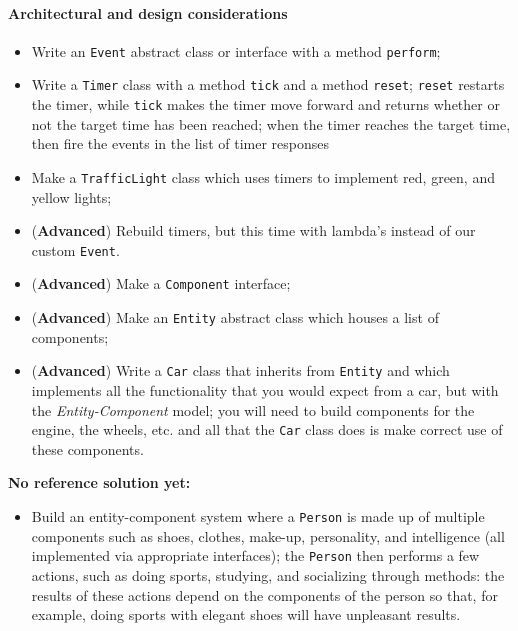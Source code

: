 \documentclass[12pt,a4paper,final]{article}
\begin{document}
		\paragraph{Architectural and design considerations}
		\begin{itemize}
			\item Write an \texttt{Event} abstract class or interface with a method \texttt{perform}; 
			\item Write a \texttt{Timer} class with a method \texttt{tick} and a method \texttt{reset}; \texttt{reset} restarts the timer, while \texttt{tick} makes the timer move forward and returns whether or not the target time has been reached; when the timer reaches the target time, then fire the events in the list of timer responses
			\item Make a \texttt{TrafficLight} class which uses timers to implement red, green, and yellow lights;
			\item (\textbf{Advanced}) Rebuild timers, but this time with lambda's instead of our custom \texttt{Event}.
			\item (\textbf{Advanced}) Make a \texttt{Component} interface;
			\item (\textbf{Advanced}) Make an \texttt{Entity} abstract class which houses a list of components;
			\item (\textbf{Advanced}) Write a \texttt{Car} class that inherits from \texttt{Entity} and which implements all the functionality that you would expect from a car, but with the \textit{Entity-Component} model; you will need to build components for the engine, the wheels, etc. and all that the \texttt{Car} class does is make correct use of these components.
		\end{itemize}

		\textbf{No reference solution yet:}
		\begin{itemize}
			\item Build an entity-component system where a \texttt{Person} is made up of multiple components such as shoes, clothes, make-up, personality, and intelligence (all implemented via appropriate interfaces); the \texttt{Person} then performs a few actions, such as doing sports, studying, and socializing through methods: the results of these actions depend on the components of the person so that, for example, doing sports with elegant shoes will have unpleasant results.			
		\end{itemize}

		
	
\end{document}
